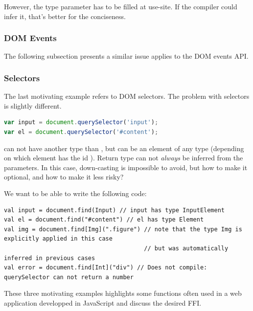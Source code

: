 \documentclass[runningheads,a4paper]{llncs}
\begin{document}
However, the type parameter  has to be filled at use-site. If the compiler could infer it,
that’s better for the conciseness.

\subsubsection{DOM Events}


The following subsection presents a similar issue applies to the DOM events API.



\subsubsection{Selectors}

The last motivating example refers to DOM selectors. The problem with selectors is slightly different.

\begin{lstlisting}[language=JavaScript]
var input = document.querySelector('input');
var el = document.querySelector('#content');
\end{lstlisting}

 can not have another type than , but  can be an element of
any type (depending on which element has the id ). Return type can not \emph{always}
be inferred from the parameters. In this case, down-casting is impossible to avoid, but how to make
it optional, and how to make it less risky?

We want to be able to write the following code:

\begin{lstlisting}
val input = document.find(Input) // input has type InputElement
val el = document.find("#content") // el has type Element
val img = document.find[Img](".figure") // note that the type Img is explicitly applied in this case
                                        // but was automatically inferred in previous cases
val error = document.find[Int]("div") // Does not compile: querySelector can not return a number
\end{lstlisting}

These three motivating examples highlights some functions often used in a web application developped in JavaScript and discuss the desired FFI. 

\end{document}

